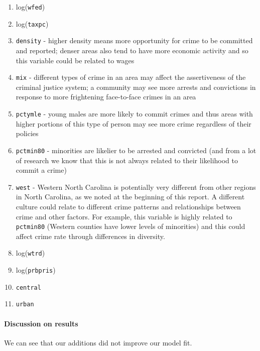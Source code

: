 \documentclass[]{article}
\let\oldparagraph\paragraph
\renewcommand{\paragraph}[1]{\oldparagraph{#1}\mbox{}}
\begin{document}
\begin{enumerate}
\def\labelenumi{(\arabic{enumi})}
\setcounter{enumi}{2}
\item
  log(\texttt{wfed})
\item
  log(\texttt{taxpc})
\item
  \texttt{density} - higher density means more opportunity for crime to
  be committed and reported; denser areas also tend to have more
  economic activity and so this variable could be related to wages
\item
  \texttt{mix} - different types of crime in an area may affect the
  assertiveness of the criminal justice system; a community may see more
  arrests and convictions in response to more frightening face-to-face
  crimes in an area
\item
  \texttt{pctymle} - young males are more likely to commit crimes and
  thus areas with higher portions of this type of person may see more
  crime regardless of their policies
\item
  \texttt{pctmin80} - minorities are likelier to be arrested and
  convicted (and from a lot of research we know that this is not always
  related to their likelihood to commit a crime)
\item
  \texttt{west} - Western North Carolina is potentially very different
  from other regions in North Carolina, as we noted at the beginning of
  this report. A different culture could relate to different crime
  patterns and relationships between crime and other factors. For
  example, this variable is highly related to \texttt{pctmin80} (Western
  counties have lower levels of minorities) and this could affect crime
  rate through differences in diversity.
\item
  log(\texttt{wtrd})
\item
  log(\texttt{prbpris})
\item
  \texttt{central}
\item
  \texttt{urban}
\end{enumerate}

\hypertarget{discussion-on-results-2}{%
\paragraph{Discussion on results}\label{discussion-on-results-2}}

We can see that our additions did not improve our model fit.
\end{document}
